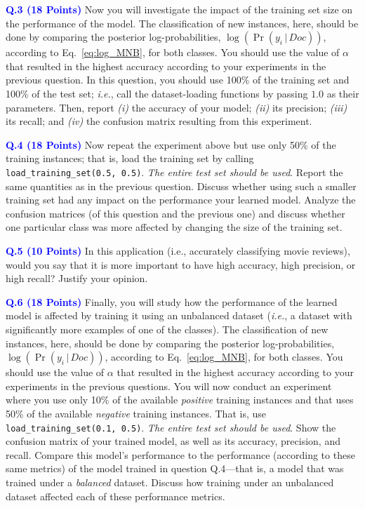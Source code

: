 \documentclass[letterpaper]{article}
\newcommand{\HIGHLIGHT}[1]{\textcolor{blue}{\textbf{#1}}}
\begin{document}
\noindent \HIGHLIGHT{Q.3 (18 Points)} Now you will investigate the impact of the training set size on the performance of the model. The classification of new instances, here, should be done by comparing the posterior log-probabilities, $\log(\Pr(y_i \, | \, Doc))$, according to Eq.~\eqref{eq:log_MNB}, for both classes. You should use the value of $\alpha$ that resulted in the highest accuracy according to your experiments in the previous question. In this question, you should use 100\% of the training set and 100\% of the test set; \textit{i.e.}, call the dataset-loading functions by passing $1.0$ as their parameters. Then, report \textit{(i)} the accuracy of your model; \textit{(ii)} its precision; \textit{(iii)} its recall; and \textit{(iv)} the confusion matrix resulting from this experiment.
%
%



\noindent \HIGHLIGHT{Q.4 (18 Points)} Now repeat the experiment above but use only 50\% of the training instances; that is, load the training set by calling \texttt{load\_training\_set(0.5, 0.5)}. \textit{The entire test set should be used}. Report the same quantities as in the previous question. Discuss whether using such a smaller training set had any impact on the performance your learned model. Analyze the confusion matrices (of this question and the previous one) and discuss whether one particular class was more affected by changing the size of the training set. 
%
%



\noindent \HIGHLIGHT{Q.5 (10 Points)} In this application (i.e., accurately classifying movie reviews), would you say that it is more important to have high accuracy, high precision, or high recall? Justify your opinion.
%
%



\noindent \HIGHLIGHT{Q.6 (18 Points)} Finally, you will study how the performance of the learned model is affected by training it using an unbalanced dataset (\textit{i.e.}, a dataset with significantly more examples of one of the classes). The classification of new instances, here, should be done by comparing the posterior log-probabilities, $\log(\Pr(y_i \, | \, Doc))$, according to Eq.~\eqref{eq:log_MNB}, for both classes. You should use the value of $\alpha$ that resulted in the highest accuracy according to your experiments in the previous questions. You will now conduct an experiment where you use only 10\% of the available \textit{positive} training instances and that uses  50\% of the available \textit{negative} training instances. That is, use \texttt{load\_training\_set(0.1, 0.5)}. \textit{The entire test set should be used}. Show the confusion matrix of your trained model, as well as its accuracy, precision, and recall. Compare this model's performance to the performance (according to these same metrics) of the model trained in question Q.4---that is, a model that was trained under a \textit{balanced} dataset. Discuss how training under an unbalanced dataset affected each of these performance metrics.
%
%
        
\end{document}
